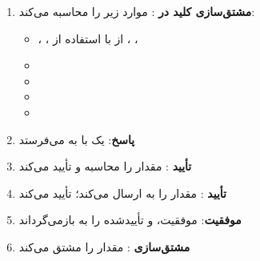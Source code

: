 \begin{enumerate}
  \begin{itemize}
  \tightlist
  \item
     را از  با استفاده از  استخراج می‌کند،  را بازیابی می‌کند
  \item
     را محاسبه و تأیید می‌کند  (احراز هویت شبکه)
  \item
    تأیید می‌کند  در محدوده قابل قبول است (محافظت از بازپخش)
  \end{itemize}
\item
  \textbf{مشتق‌سازی کلید در }:  موارد زیر را محاسبه می‌کند:

  \begin{itemize}
  \tightlist
  \item
    ، ،  از  با استفاده از ، ، 
  \item
  \item
  \item
  \item
  \end{itemize}
\item
  \textbf{پاسخ}:  یک  با  به  می‌فرستد
\item
  \textbf{تأیید }:  مقدار  را محاسبه و تأیید می‌کند 
\item
  \textbf{تأیید }:  مقدار  را به  ارسال می‌کند؛  تأیید می‌کند 
\item
  \textbf{موفقیت}:  موفقیت،  و  تأییدشده را به  بازمی‌گرداند
\item
  \textbf{مشتق‌سازی }:  مقدار  را مشتق می‌کند
\end{enumerate}


